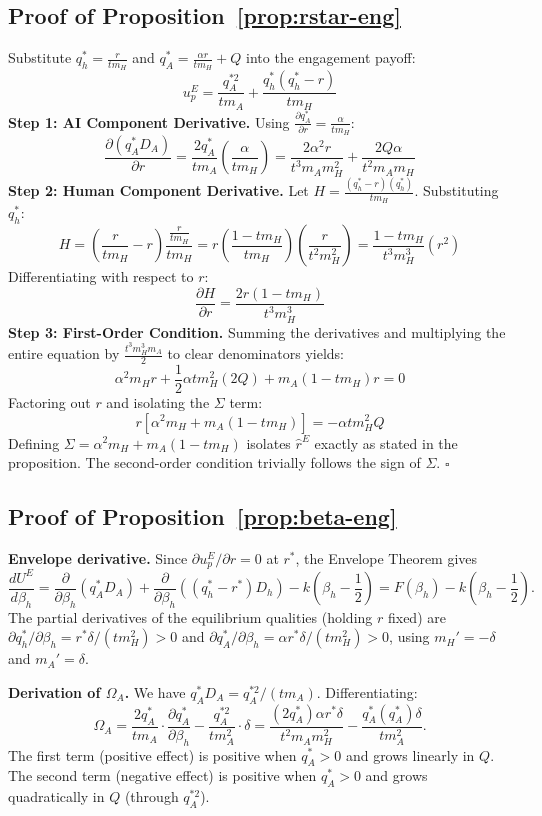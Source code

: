 \documentclass[mnsc,nonblindrev]{informs3_NoOR}
\begin{document}
 
\subsection*{Proof of Proposition~\ref{prop:rstar-eng}}
Substitute $q_h^* = \frac{r}{t m_H}$ and $q_A^* = \frac{\alpha r}{t m_H} + Q$ into the engagement payoff:
\[
u_p^E = \frac{q_A^{*2} }{t m_A} + \frac{q_h^*(q_h^* - r) }{t m_H}
\]
\textbf{Step 1: AI Component Derivative.} Using $\frac{\partial q_A^*}{\partial r} = \frac{\alpha}{t m_H}$:
\[
\frac{\partial(q_A^* D_A)}{\partial r} = \frac{2q_A^*}{t m_A}\left(\frac{\alpha}{t m_H}\right) = \frac{2\alpha^2 r}{t^3 m_A m_H^2} + \frac{2Q\alpha}{t^2 m_A m_H}
\]
\textbf{Step 2: Human Component Derivative.} Let $H = \frac{(q_h^* - r)(q_h^*)}{t m_H}$. Substituting $q_h^*$:
\[
H = \left(\frac{r}{t m_H} - r\right)\frac{\frac{r}{t m_H} }{t m_H} = r\left(\frac{1 - t m_H}{t m_H}\right)\left(\frac{r }{t^2 m_H^2}\right) = \frac{1 - t m_H}{t^3 m_H^3}(r^2 )
\]
Differentiating with respect to $r$:
\[
\frac{\partial H}{\partial r}  = \frac{2r(1 - t m_H)}{t^3 m_H^3}
\]
\textbf{Step 3: First-Order Condition.} Summing the derivatives and multiplying the entire equation by $\frac{t^3 m_H^3 m_A}{2}$ to clear denominators yields:
\[
\alpha^2 m_H r + \frac{1}{2}\alpha t m_H^2 (2Q) + m_A(1 - t m_H)r= 0
\]
Factoring out $r$ and isolating the $\Sigma$ term:
\[
r\left[\alpha^2 m_H + m_A(1 - t m_H)\right] = -\alpha t m_H^2 Q
\]
Defining $\Sigma = \alpha^2 m_H + m_A(1 - t m_H)$ isolates $\hat{r}^E$ exactly as stated in the proposition. The second-order condition trivially follows the sign of $\Sigma$. \hfill$\square$

\subsection*{Proof of Proposition~\ref{prop:beta-eng}}
\noindent\textbf{Envelope derivative.}
Since $\partial u_p^E/\partial r = 0$ at $r^*$, the Envelope Theorem gives
\[
\frac{dU^E}{d\beta_h} = \frac{\partial}{\partial\beta_h}(q_A^* D_A) + \frac{\partial}{\partial\beta_h}((q_h^*-r^*)D_h) - k\!\left(\beta_h-\frac{1}{2}\right) = F(\beta_h) - k\!\left(\beta_h-\frac{1}{2}\right).
\]
The partial derivatives of the equilibrium qualities (holding $r$ fixed) are $\partial q_h^*/\partial\beta_h = r^*\delta/(tm_H^2)>0$ and $\partial q_A^*/\partial\beta_h = \alpha r^*\delta/(tm_H^2)>0$, using $m_H'=-\delta$ and $m_A'=\delta$.
 
\medskip\noindent\textbf{Derivation of $\Omega_A$.}
We have $q_A^* D_A = q_A^{*2}/(tm_A)$. Differentiating:
\[
\Omega_A = \frac{2q_A^*}{tm_A}\cdot\frac{\partial q_A^*}{\partial\beta_h} - \frac{q_A^{*2}}{tm_A^2}\cdot\delta = \frac{(2q_A^*)\alpha r^*\delta}{t^2 m_A m_H^2} - \frac{q_A^*(q_A^*)\delta}{tm_A^2}.
\]
The first term (positive effect) is positive when $q_A^*>0$ and grows linearly in $Q$. The second term (negative effect) is positive when $q_A^*>0$ and grows quadratically in $Q$ (through $q_A^{*2}$).
 
\end{document}
